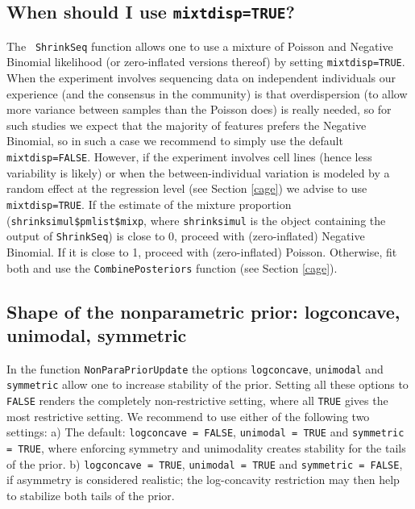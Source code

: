 \documentclass[11pt]{article}
\begin{document}
\subsection{When should I use {\tt mixtdisp=TRUE}?} The {\tt
ShrinkSeq} function allows one to use a mixture of Poisson and
Negative Binomial likelihood (or zero-inflated versions
thereof) by setting {\tt mixtdisp=TRUE}. When the experiment
involves sequencing data on independent individuals our
experience (and the consensus in the community) is that
overdispersion (to allow more variance between samples than the
Poisson does) is really needed, so for such studies we expect
that the majority of features prefers the Negative Binomial, so
in such a case we recommend to simply use the default {\tt
mixtdisp=FALSE}. However, if the experiment involves cell lines
(hence less variability is likely) or when the
between-individual variation is modeled by a random effect at
the regression level (see Section \ref{cage}) we advise to use
{\tt mixtdisp=TRUE}. If the estimate of the mixture proportion
({\tt shrinksimul\$pmlist\$mixp}, where {\tt shrinksimul} is the
object containing the output of {\tt ShrinkSeq}) is close to 0,
proceed with (zero-inflated) Negative Binomial. If it is close
to 1, proceed with (zero-inflated) Poisson. Otherwise, fit both
and use the {\tt CombinePosteriors} function (see Section
\ref{cage}).

\subsection{Shape of the nonparametric prior: logconcave, unimodal, symmetric}
In the function {\tt NonParaPriorUpdate} the options {\tt logconcave}, {\tt unimodal} and {\tt symmetric} allow one to
increase stability of the prior. Setting all these options to {\tt FALSE} renders the completely non-restrictive setting, where
all {\tt TRUE} gives the most restrictive setting. We recommend to use either of the following two settings:
a) The default: {\tt logconcave = FALSE}, {\tt unimodal = TRUE} and {\tt symmetric = TRUE}, where enforcing symmetry and unimodality
creates stability for the tails of the prior. b) {\tt logconcave = TRUE}, {\tt unimodal = TRUE} and {\tt symmetric = FALSE},
if asymmetry is considered realistic; the log-concavity restriction may then help to stabilize both tails of the prior.
\end{document}
